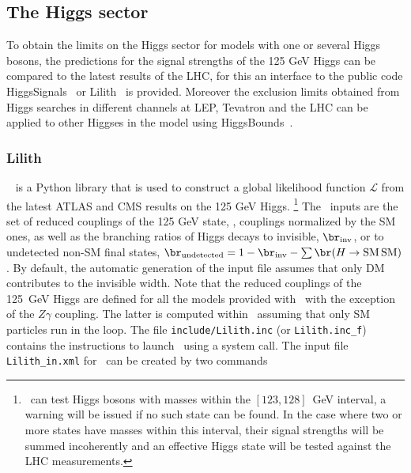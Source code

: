 \documentclass[12pt,a4paper]{article}
\begin{document}
{\subsection{The Higgs sector}
To obtain the  limits on the Higgs sector for models with one or several Higgs bosons, the predictions for the signal strengths of the 125 GeV Higgs  can be
compared  to the latest results of the LHC, for this an interface to the public code HiggsSignals~\cite{Bechtle:2013xfa} or Lilith~\cite{Bernon:2015hsa} is provided.
Moreover the exclusion limits obtained from Higgs searches in different channels at LEP, Tevatron and the LHC can be applied to other Higgses in the model using 
HiggsBounds~\cite{Bechtle:2013wla}. 


\subsubsection{Lilith}\label{sec:lilith}


\lilith~\cite{Bernon:2015hsa} is a Python library that is used to construct a global likelihood function $\mathcal{L}$  from the latest ATLAS and CMS results on the 125 GeV Higgs. 
\footnote{\lilith\ can test Higgs bosons with masses within the $[123, 128]$~GeV interval, a warning will be issued if no such state can be found. In the case where two or more states have masses within this interval, their signal strengths will be summed incoherently and an effective Higgs state will be tested against the LHC measurements.}
The \lilith\ inputs are the set of reduced couplings of the 125 GeV state, \ie, couplings normalized by the SM ones, as well as the  branching ratios of Higgs decays to invisible, $\br_{\rm inv}$, or to undetected non-SM final states,
$\br_{\rm undetected}=1-\br_{\rm inv}-\sum \br(H\rightarrow {\rm SM \,SM})$. 
By default, the automatic generation of the input file assumes that only DM contributes to the invisible width. 
Note that the reduced couplings of the 125~GeV Higgs are defined for all the models provided with \micro\ with the exception of the $Z\gamma$ coupling. The latter is computed within \lilith\ assuming that only SM particles run in the loop. 
The file \verb|include/Lilith.inc| (or \verb|Lilith.inc_f|) contains the instructions to launch \lilith\ using a system call. 
The input file  \verb|Lilith_in.xml| for \lilith\ can be created by two  commands\\

}
\end{document}
